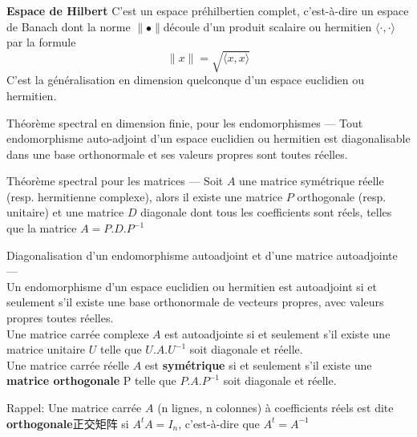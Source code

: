\textbf{Espace de Hilbert}
C'est un espace pr\'ehilbertien complet, c'est-\`a-dire un espace de Banach dont la norme $\parallel\bullet\parallel$d\'ecoule d'un produit scalaire ou hermitien $\langle\cdot,\cdot\rangle$ par la formule
 $$\parallel x\parallel = \sqrt{\langle x,x \rangle}$$
C'est la g\'en\'eralisation en dimension quelconque d'un espace euclidien ou hermitien.
\bigskip

\begin{theorem}
Th\'eor\`eme spectral en dimension finie, pour les endomorphismes —  Tout endomorphisme auto-adjoint d'un espace euclidien ou hermitien est diagonalisable dans une base orthonormale et ses valeurs propres sont toutes r\'eelles.

Th\'eor\`eme spectral pour les matrices —  Soit $A$ une matrice sym\'etrique r\'eelle (resp. hermitienne complexe), alors il existe une matrice $P$ orthogonale (resp. unitaire) et une matrice $D$ diagonale dont tous les coefficients sont r\'eels, telles que la matrice $A = P.D.P^{-1}$
\end{theorem}

\begin{theorem}
Diagonalisation d'un endomorphisme autoadjoint et d'une matrice autoadjointe — \\
Un endomorphisme d'un espace euclidien ou hermitien est autoadjoint si et seulement s'il existe une base orthonormale de vecteurs propres, avec valeurs propres toutes r\'eelles.\\
Une matrice carr\'ee complexe $A$ est autoadjointe si et seulement s'il existe une matrice unitaire $U$ telle que $U.A.U^{-1}$ soit diagonale et r\'eelle.\\
Une matrice carr\'ee r\'eelle $A$ est \textbf{sym\'etrique} si et seulement s'il existe une \textbf{matrice orthogonale} P telle que $P.A.P^{-1}$ soit diagonale et r\'eelle.
\end{theorem}
Rappel:
Une matrice carr\'ee $A$ (n lignes, n colonnes) \`a coefficients r\'eels est dite \textbf{orthogonale}正交矩阵 si $A^t A = I_n$, c'est-\`a-dire que $A^t = A^{-1}$

